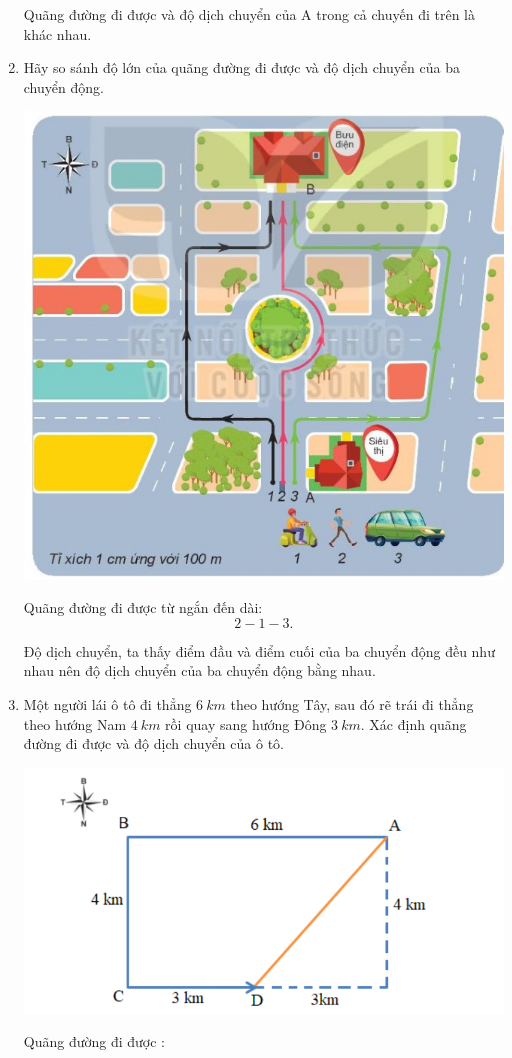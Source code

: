 \begin{enumerate}[label=\bfseries Bài \arabic*:,leftmargin=1.5cm]
{\begin{enumerate}[label=\alph*)]
			
			Quãng đường đi được và độ dịch chuyển của A trong cả chuyến đi trên là khác nhau. 
			
		\end{enumerate}
	}
	
	\item {}
	
	
	{
		Hãy so sánh độ lớn của quãng đường đi được và độ dịch chuyển của ba chuyển động. 
		
		\begin{center}
			\includegraphics[scale=0.8]{../figs/VN10-2022-PH-TP004-3.jpg}
		\end{center}
	}
	
	\hideall
	{	
		Quãng đường đi được từ ngắn đến dài: $$2 - 1 - 3.$$
		
		Độ dịch chuyển, ta thấy điểm đầu và điểm cuối của ba chuyển động đều như nhau nên độ dịch chuyển của ba chuyển động bằng nhau.
		
	}
	
	
	\item {}
	
	
	{
		Một người lái ô tô đi thẳng $\SI{6}{km}$ theo hướng Tây, sau đó rẽ trái đi thẳng theo hướng Nam $\SI{4}{km}$ rồi quay sang hướng Đông $\SI{3}{km}$. Xác định quãng đường đi được và độ dịch chuyển của ô tô.
	}
	
	\hideall
	{	\begin{center}
			\includegraphics[width=0.4\linewidth]{../figs/VN10-2022-PH-TP004-P-1}
		\end{center}
		Quãng đường đi được :
		
}
\end{enumerate}
